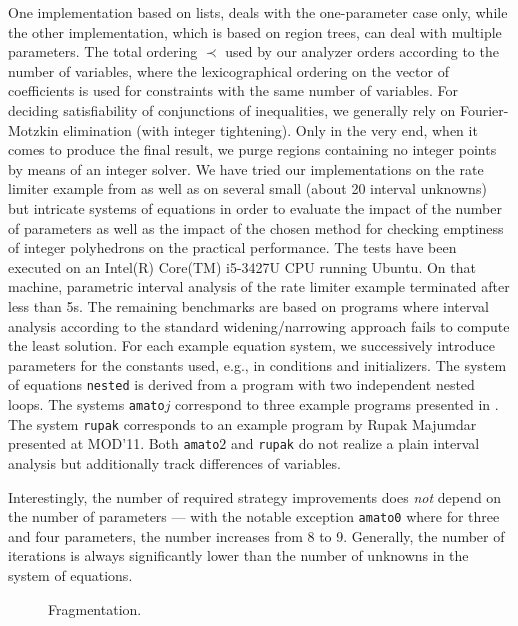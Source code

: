 \documentclass[a4paper]{easychair}
\begin{document}
One implementation based on lists, deals with the one-parameter case only, while the other implementation, 
which is based on region trees, can deal with multiple parameters.
The total ordering $\prec$ used by our analyzer orders according to the number of variables,
where the lexicographical ordering on the vector of coefficients is used for constraints with the 
same number of variables.
For deciding satisfiability of conjunctions of inequalities, we generally rely on Fourier-Motzkin elimination
(with integer tightening).
Only in the very end, when it comes to produce the final result, we purge regions containing no integer points
by means of an integer solver.
We have tried our implementations on the rate limiter example from \cite{monniaux09} as well as 
on several small (about 20 interval unknowns) but intricate systems of equations
in order to evaluate the impact of the number of parameters as well as 
the impact of the chosen method for checking emptiness of integer polyhedrons
on the practical performance.
The tests have been executed on an Intel(R) Core(TM) i5-3427U CPU running Ubuntu.
On that machine, parametric interval analysis of the rate limiter example 
terminated after less than 5s.
The remaining benchmarks are based on programs where interval analysis according to the
standard widening/narrowing approach fails to compute the least solution.
For each example equation system, we successively introduce parameters for
the constants used, e.g., in conditions and initializers.
The system of equations \texttt{nested} is derived from a program with two independent nested loops.
The systems \texttt{amato}$j$ correspond to three example programs presented in
\cite{DBLP:conf/sas/AmatoS13}.
The system \texttt{rupak} corresponds to an example program by
Rupak Majumdar presented at MOD'11.
Both \texttt{amato}$2$ and \texttt{rupak} do not realize a plain interval analysis
but additionally track differences of variables.


Interestingly, the number of required strategy improvements does \emph{not} depend
on the number of parameters --- with the notable exception \texttt{amato0} where for three and four parameters,
the number increases from 8 to 9. Generally, the number of iterations is always significantly lower than the
number of unknowns in the system of equations.


\begin{figure*}[hbt]\centering
{}
\caption{Fragmentation.}
\label{fig:regions}
\end{figure*}
\end{document}
